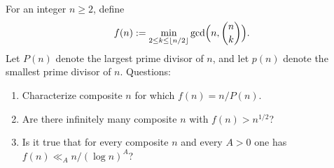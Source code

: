 For an integer $n\ge 2$, define
\[f(n) := \min_{2\le k\le \lfloor n/2\rfloor}\gcd\Bigl(n,\binom{n}{k}\Bigr).
\]
Let $P(n)$ denote the largest prime divisor of $n$, and let $p(n)$ denote the smallest prime divisor of $n$.
Questions:
\begin{enumerate}
\item Characterize composite $n$ for which $f(n)=n/P(n)$.
\item Are there infinitely many composite $n$ with $f(n)>n^{1/2}$?
\item Is it true that for every composite $n$ and every $A>0$ one has $f(n)\ll_A n/(\log n)^A$?
\end{enumerate}
